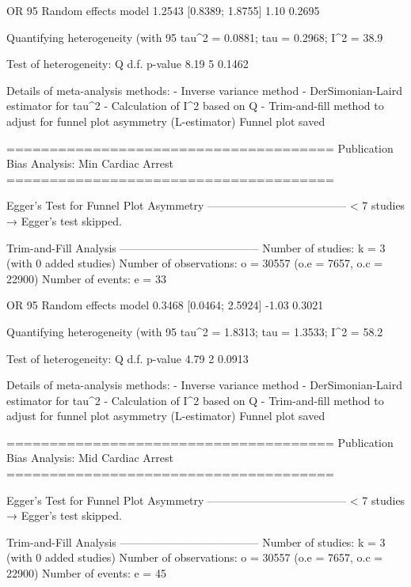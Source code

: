                          OR           95%
Random effects model 1.2543 [0.8389; 1.8755] 1.10  0.2695

Quantifying heterogeneity (with 95%
 tau^2 = 0.0881; tau = 0.2968; I^2 = 38.9%

Test of heterogeneity:
    Q d.f. p-value
 8.19    5  0.1462

Details of meta-analysis methods:
- Inverse variance method
- DerSimonian-Laird estimator for tau^2
- Calculation of I^2 based on Q
- Trim-and-fill method to adjust for funnel plot asymmetry (L-estimator)
  Funnel plot saved

======================================
Publication Bias Analysis: Min Cardiac Arrest 
======================================
                                                                                                                                                        
Egger's Test for Funnel Plot Asymmetry
--------------------------------------
  < 7 studies → Egger’s test skipped.

Trim-and-Fill Analysis
--------------------------------------
Number of studies: k = 3 (with 0 added studies)
Number of observations: o = 30557 (o.e = 7657, o.c = 22900)
Number of events: e = 33

                         OR           95%
Random effects model 0.3468 [0.0464; 2.5924] -1.03  0.3021

Quantifying heterogeneity (with 95%
 tau^2 = 1.8313; tau = 1.3533; I^2 = 58.2%

Test of heterogeneity:
    Q d.f. p-value
 4.79    2  0.0913

Details of meta-analysis methods:
- Inverse variance method
- DerSimonian-Laird estimator for tau^2
- Calculation of I^2 based on Q
- Trim-and-fill method to adjust for funnel plot asymmetry (L-estimator)
  Funnel plot saved

======================================
Publication Bias Analysis: Mid Cardiac Arrest 
======================================
                                                                                                                                                        
Egger's Test for Funnel Plot Asymmetry
--------------------------------------
  < 7 studies → Egger’s test skipped.

Trim-and-Fill Analysis
--------------------------------------
Number of studies: k = 3 (with 0 added studies)
Number of observations: o = 30557 (o.e = 7657, o.c = 22900)
Number of events: e = 45

